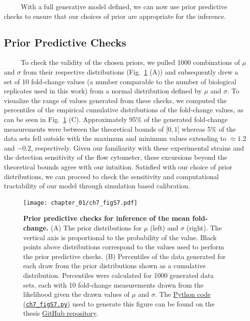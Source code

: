\documentclass[12pt]{caltech_thesis}
\begin{document}
~~~~~With a full generative model defined, we can now use prior
predictive checks to ensure that our choices of prior are appropriate
for the inference.

\hypertarget{prior-predictive-checks-1}{%
\subsection{Prior Predictive Checks}\label{prior-predictive-checks-1}}

~~~~~To check the validity of the chosen priors, we pulled 1000
combinations of \(\mu\) and \(\sigma\) from their respective
distributions (Fig.~\ref{fig:empirical_F_prior_pred} (A)) and
subsequently drew a set of 10 fold-change values (a number comparable to
the number of biological replicates used in this work) from a normal
distribution defined by \(\mu\) and \(\sigma\). To visualize the range
of values generated from these checks, we computed the percentiles of
the empirical cumulative distributions of the fold-change values, as can
be seen in Fig.~\ref{fig:empirical_F_prior_pred} (C). Approximately 95\%
of the generated fold-change measurements were between the theoretical
bounds of {[}\(0, 1\){]} whereas 5\% of the data sets fell outside with
the maximum and minimum values extending to \(\approx 1.2\) and
\(-0.2\), respectively. Given our familiarity with these experimental
strains and the detection sensitivity of the flow cytometer, these
excursions beyond the theoretical bounds agree with our intuition.
Satisfied with our choice of prior distributions, we can proceed to
check the sensitivity and computational tractability of our model
through simulation based calibration.

\hypertarget{fig:empirical_F_prior_pred}{%
\begin{figure}
\centering
\texttt{[image: chapter\_01/ch7\_figS7.pdf]}
\caption[{Prior predictive checks for inference of the mean
fold-change}]{\textbf{Prior predictive checks for inference of the mean
fold-change.} (A) The prior distributions for \(\mu\) (left) and
\(\sigma\) (right). The vertical axis is proportional to the probability
of the value. Black points above distributions correspond to the values
used to perform the prior predictive checks. (B) Percentiles of the data
generated for each draw from the prior distributions shown as a
cumulative distribution. Percentiles were calculated for 1000 generated
data sets, each with 10 fold-change measurements drawn from the
likelihood given the drawn values of \(\mu\) and \(\sigma\). The
\href{https://github.com/gchure/phd/blob/master/src/chapter_07/code/ch7_figS7.py}{Python
code (\texttt{ch7\_figS7.py})} used to generate this figure can be found
on the thesis \href{https://github.com/gchure/phd}{GitHub repository}.}
\label{fig:empirical_F_prior_pred}
\end{figure}
}
\end{document}
